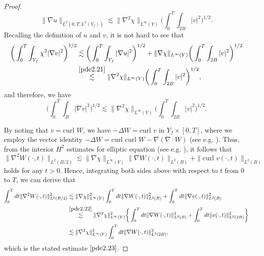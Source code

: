 \documentclass[13pt,CJK]{article}
\theoremstyle{plain}                       %
\theoremstyle{remark}
\numberwithin{equation}{section}
\begin{document}
\begin{proof}
\begin{equation}
\|\nabla u\|_{L^2(0,T;L^2(Y_f))}
\lesssim
\|\nabla^2\chi\|_{L^{\infty}(Y)}\bigg(\int_{0}^{T}
\int_{2B}|v|^2\bigg)^{1/2}.
\end{equation}
Recalling the definition of $u$ and $v$, it is not hard to see that
\begin{equation*}
\begin{aligned}
\bigg(\int_{0}^{T}\int_{Y_f}\chi^2|\nabla v|^2\bigg)^{1/2}
&\lesssim
\bigg(
\int_{0}^{T}\int_{Y_f}|\nabla u|^2
\bigg)^{1/2}+
\|\nabla\chi\|_{L^{\infty}(Y)}
\bigg(
\int_{0}^{T}\int_{2B}|v|^2
\bigg)^{1/2}\\
&\overset{\eqref{pde2.21}}{\lesssim}
\|\nabla^2\chi\|_{L^{\infty}(Y)}
\bigg(
\int_{0}^{T}\int_{2B}|v|^2
\bigg)^{1/2},
\end{aligned}
\end{equation*}
and therefore, we have
 \begin{equation}\label{pde2.22}
\bigg(\int_{0}^{T}\int_{B}|\nabla v|^2\bigg)^{1/2}
\lesssim
\|\nabla^2\chi\|_{L^{\infty}(Y)}
\bigg(
\int_{0}^{T}\int_{2B}|v|^2
\bigg)^{1/2}.
\end{equation}

By noting that $v=\text{curl~}W$,
we have $-\Delta W=\text{curl~} v$ in $Y_f\times[0,T]$, where we employ
the vector identity $-\Delta W =\text{curl~}\text{curl~}W-\nabla(\nabla\cdot W)$ (see e.g.  \cite[pp.9]{Tsai18}).
Thus, from the interior $H^2$ estimates for elliptic equation (see e.g. \cite[Chapter 4]{Giaquinta-Martinazzi12}), it follows that
\begin{equation*}
\|\nabla^2 W(\cdot,t)\|_{L^2(B/2)}
\lesssim
\|\nabla \chi\|_{L^{\infty}(Y)}\|\nabla W(\cdot,t)\|_{L^2(B)}+
\|\text{curl~} v(\cdot,t)\|_{L^2(B)}
\end{equation*}
holds for any $t>0$. Hence, integrating both sides above with respect to  $t$ from 0 to $T$, we can derive that
\begin{equation*}
\begin{aligned}
\int_{0}^Tdt\|\nabla^2 W(\cdot,t)\|^2_{L^2(B/2)}
&\lesssim
\|\nabla \chi\|^2_{L^{\infty}(Y)}
\int_{0}^{T}dt\|\nabla W(\cdot,t)\|^2_{L^2(B)}
+\int_{0}^{T}dt\|\nabla v(\cdot,t)\|^2_{L^2(B)}\\
&\overset{\eqref{pde2.22}}{\lesssim}
\|\nabla^2\chi\|^2_{L^{\infty}(Y)}
\bigg\{\int_{0}^{T}dt\|\nabla W(\cdot,t)\|^2_{L^2(B)}
+\int_{0}^{T}dt\|v(\cdot,t)\|^2_{L^2(2B)}\bigg\}\\
&\lesssim\|\nabla^2\chi\|^2_{L^{\infty}(Y)}
\int_{0}^{T}dt\|\nabla W(\cdot,t)\|^2_{L^2(2B)},
\end{aligned}
\end{equation*}
which is the stated estimate $\eqref{pde2.23}$.



\end{proof}
\end{document}

